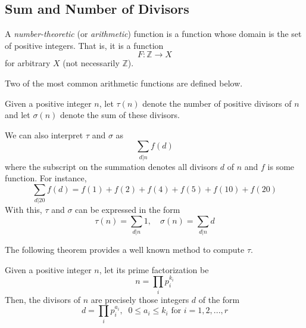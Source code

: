 \documentclass{article}
\newcounter{theorem}[section]
\newcounter{definition}[section]
\begin{document}
\subsection{Sum and Number of Divisors}
\begin{definition}
  \label{def:number-theoretic-function}
A \textit{number-theoretic} (or \textit{arithmetic}) function is a function whose domain is the set of positive integers. That is, it is a function 
\begin{equation}
  F: \mathbb{Z} \to X
\end{equation}
for arbitrary $X$ (not necessarily $\mathbb{Z}$). 
\end{definition}

Two of the most common arithmetic functions are defined below. 

\begin{definition}
  \label{def:divisor-counting-and-divisor-sum-functions}
Given a positive integer $n$, let $\tau(n)$ denote the number of positive divisors of $n$ and let $\sigma(n)$ denote the sum of these divisors. 

We can also interpret $\tau$ and $\sigma$ as 
\begin{equation}
  \sum_{d|n} f(d)
\end{equation}
where the subscript on the summation denotes all divisors $d$ of $n$ and $f$ is some function. For instance,
\begin{equation}
  \sum_{d|20} f(d) = f(1) + f(2) + f(4) + f(5) + f(10) + f(20)
\end{equation}
With this, $\tau$ and $\sigma$ can be expressed in the form 
\begin{equation}
  \tau(n) = \sum_{d|n} 1, \quad \sigma(n) = \sum_{d|n} d
\end{equation}
\end{definition}

The following theorem provides a well known method to compute $\tau$. 

\begin{theorem}
  \label{thm:divisor-functions-from-the-prime-factorization}
Given a positive integer $n$, let its prime factorization be 
\begin{equation}
  n = \prod_{i} p_i^{k_i}
\end{equation}
Then, the divisors of $n$ are precisely those integers $d$ of the form 
\begin{equation}
  d = \prod_i p_i^{a_i}, \;\; 0 \leq a_i \leq k_i \text{ for } i = 1, 2, ..., r
\end{equation}
\end{theorem}
\end{document}
